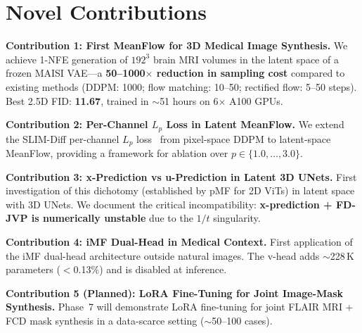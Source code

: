 \section{Novel Contributions}
\label{sec:contributions}

\textbf{Contribution 1: First MeanFlow for 3D Medical Image Synthesis.}
We achieve 1-NFE generation of $192^3$ brain MRI volumes in the latent space
of a frozen MAISI VAE---a \textbf{50--1000$\times$ reduction in sampling cost}
compared to existing methods (DDPM: 1000; flow matching: 10--50; rectified
flow: 5--50 steps).  Best 2.5D FID: \textbf{11.67}, trained in ${\sim}$51
hours on 6$\times$ A100 GPUs.

\textbf{Contribution 2: Per-Channel $L_p$ Loss in Latent MeanFlow.}
We extend the SLIM-Diff per-channel $L_p$ loss~\cite{slimdiff} from
pixel-space DDPM to latent-space MeanFlow, providing a framework for
ablation over $p \in \{1.0,\ldots,3.0\}$.

\textbf{Contribution 3: x-Prediction vs u-Prediction in Latent 3D UNets.}
First investigation of this dichotomy (established by pMF for 2D ViTs) in
latent space with 3D UNets.  We document the critical incompatibility:
\textbf{x-prediction + FD-JVP is numerically unstable} due to the $1/t$
singularity.

\textbf{Contribution 4: iMF Dual-Head in Medical Context.}
First application of the iMF dual-head architecture outside natural images.
The v-head adds ${\sim}$228\,K parameters ($<$0.13\%) and is disabled at
inference.

\textbf{Contribution 5 (Planned): LoRA Fine-Tuning for Joint Image-Mask
Synthesis.}  Phase~7 will demonstrate LoRA fine-tuning for joint FLAIR MRI +
FCD mask synthesis in a data-scarce setting (${\sim}$50--100 cases).
